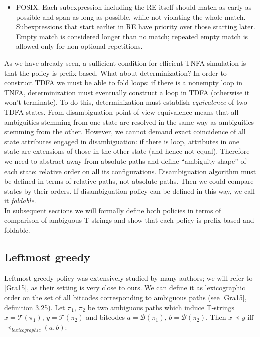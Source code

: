 \documentclass{article}
\newcommand{\Xeq}{\!=\!}
\newcommand{\XB}{\mathcal{B}}
\newcommand{\XT}{\mathcal{T}}
\theoremstyle{definition}
\begin{document}
\begin{multicols}{2}
\begin{itemize}
    \item POSIX.
        Each subexpression including the RE itself should match as early as possible
        and span as long as possible, while not violating the whole match.
        Subexpressions that start earlier in RE have priority over those starting later.
        Empty match is considered longer than no match;
        repeated empty match is allowed only for non-optional repetitions.
    \\
\end{itemize}

As we have already seen, a sufficient condition for efficient TNFA simulation is that the policy is prefix-based.
What about determinization?
In order to construct TDFA we must be able to fold loops:
if there is a nonempty loop in TNFA, determinization must eventually construct a loop in TDFA
(otherwise it won't terminate).
To do this, determinization must establish \emph{equivalence} of two TDFA states.
From disambiguation point of view equivalence means that all ambiguities stemming from one state
are resolved in the same way as ambiguities stemming from the other.
However, we cannot demand exact coincidence of all state attributes engaged in disambiguation:
if there is loop, attributes in one state are extensions of those in the other state (and hence not equal).
Therefore we need to abstract away from absolute paths and define ``ambiguity shape'' of each state: relative order on all its configurations.
Disambiguation algorithm must be defined in terms of relative paths, not absolute paths.
Then we could compare states by their orders.
If disambiguation policy can be defined in this way, we call it \emph{foldable}.
\\

In subsequent sections we will formally define both policies in terms of comparison of ambiguous T-strings
and show that each policy is prefix-based and foldable.

\subsection*{Leftmost greedy}

Leftmost greedy policy was extensively studied by many authors; we will refer to [Gra15], as their setting is very close to ours.
We can define it as lexicographic order on the set of all bitcodes corresponding to ambiguous paths
(see [Gra15], definition 3.25).
Let $\pi_1$, $\pi_2$ be two ambiguous paths which induce T-strings $x \Xeq \XT(\pi_1)$, $y \Xeq \XT(\pi_2)$
and bitcodes $a \Xeq \XB(\pi_1)$, $b \Xeq \XB(\pi_2)$.
Then $x \prec y$ iff $\prec_{lexicographic} (a, b)$:
\\


\end{multicols}
\end{document}
